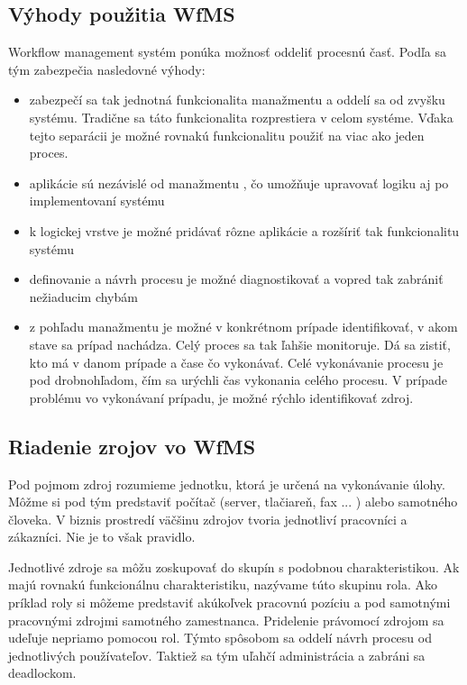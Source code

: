 %
\subsection{Výhody použitia WfMS}
Workflow management systém ponúka možnosť oddeliť procesnú časť. Podľa \cite{workflow_vyhody} sa tým zabezpečia nasledovné výhody:
\begin{itemize}
	\item zabezpečí sa tak jednotná funkcionalita manažmentu a oddelí sa od zvyšku systému. Tradične sa táto funkcionalita rozprestiera v celom systéme. Vďaka tejto separácii je možné rovnakú funkcionalitu použiť na viac ako jeden proces.
	\item aplikácie sú nezávislé od manažmentu , čo umožňuje upravovať logiku aj po implementovaní systému
	\item k logickej vrstve je možné pridávať rôzne aplikácie a rozšíriť tak funkcionalitu systému
	\item definovanie a návrh procesu je možné diagnostikovať a vopred tak zabrániť nežiaducim chybám
	\item z pohľadu manažmentu je možné v konkrétnom prípade identifikovať, v akom stave sa prípad nachádza. Celý proces sa tak ľahšie monitoruje. Dá sa zistiť, kto má v danom prípade a čase čo vykonávať. Celé vykonávanie procesu je pod drobnohľadom, čím sa urýchli čas vykonania celého procesu. V prípade problému vo vykonávaní prípadu, je možné rýchlo identifikovať zdroj.
	
\end{itemize}

\subsection{Riadenie zrojov vo WfMS}
Pod pojmom zdroj rozumieme jednotku, ktorá je určená na vykonávanie úlohy. Môžme si pod tým predstaviť počítač (server, tlačiareň, fax ... ) alebo samotného človeka. V biznis prostredí väčšinu zdrojov tvoria jednotliví pracovníci a zákazníci. Nie je to však pravidlo.

Jednotlivé zdroje sa môžu zoskupovať do skupín s podobnou charakteristikou. Ak majú rovnakú funkcionálnu charakteristiku, nazývame túto skupinu rola.
Ako príklad roly si môžeme predstaviť akúkoľvek pracovnú pozíciu a pod samotnými pracovnými zdrojmi samotného zamestnanca. Pridelenie právomocí zdrojom sa udeľuje nepriamo pomocou rol. Týmto spôsobom sa oddelí návrh procesu od jednotlivých používateľov. Taktiež sa tým uľahčí administrácia a zabráni sa deadlockom.


